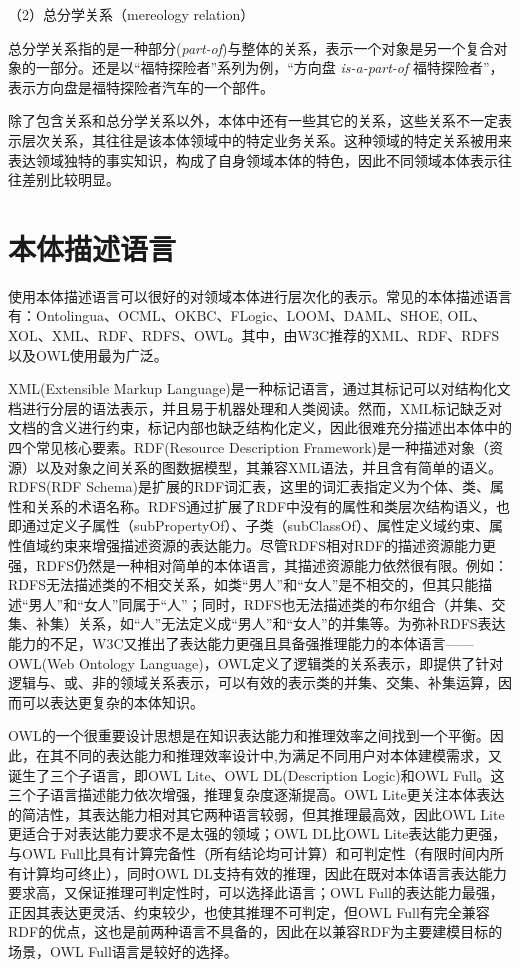 （2）总分学关系（mereology relation）

总分学关系指的是一种部分(\textit{part-of})与整体的关系，表示一个对象是另一个复合对象的一部分。还是以“福特探险者”系列为例，“方向盘 \textit{is-a-part-of} 福特探险者”，表示方向盘是福特探险者汽车的一个部件。

除了包含关系和总分学关系以外，本体中还有一些其它的关系，这些关系不一定表示层次关系，其往往是该本体领域中的特定业务关系。这种领域的特定关系被用来表达领域独特的事实知识，构成了自身领域本体的特色，因此不同领域本体表示往往差别比较明显。

\section{本体描述语言}
使用本体描述语言可以很好的对领域本体进行层次化的表示。常见的本体描述语言有：Ontolingua、OCML、OKBC、FLogic、LOOM、DAML、SHOE, OIL、XOL、XML、RDF、RDFS、OWL\cite{Corcho}。其中，由W3C推荐的XML、RDF、RDFS以及OWL使用最为广泛。

XML(Extensible Markup Language)\cite{xml}是一种标记语言，通过其标记可以对结构化文档进行分层的语法表示，并且易于机器处理和人类阅读。然而，XML标记缺乏对文档的含义进行约束，标记内部也缺乏结构化定义，因此很难充分描述出本体中的四个常见核心要素。RDF(Resource Description Framework)\cite{rdf}是一种描述对象（资源）以及对象之间关系的图数据模型，其兼容XML语法，并且含有简单的语义。RDFS(RDF Schema)\cite{rdfs}是扩展的RDF词汇表，这里的词汇表指定义为个体、类、属性和关系的术语名称。RDFS通过扩展了RDF中没有的属性和类层次结构语义，也即通过定义子属性（subPropertyOf）、子类（subClassOf）、属性定义域约束、属性值域约束来增强描述资源的表达能力。尽管RDFS相对RDF的描述资源能力更强，RDFS仍然是一种相对简单的本体语言，其描述资源能力依然很有限\cite{gao}。例如：RDFS无法描述类的不相交关系，如类“男人”和“女人”是不相交的，但其只能描述“男人”和“女人”同属于“人”；同时，RDFS也无法描述类的布尔组合（并集、交集、补集）关系，如“人”无法定义成“男人”和“女人”的并集等。为弥补RDFS表达能力的不足，W3C又推出了表达能力更强且具备强推理能力的本体语言——OWL(Web Ontology Language)\cite{owl}，OWL定义了逻辑类的关系表示，即提供了针对逻辑与、或、非的领域关系表示，可以有效的表示类的并集、交集、补集运算，因而可以表达更复杂的本体知识。

OWL的一个很重要设计思想是在知识表达能力和推理效率之间找到一个平衡。因此，在其不同的表达能力和推理效率设计中,为满足不同用户对本体建模需求，又诞生了三个子语言，即OWL Lite、OWL DL(Description Logic)和OWL Full。这三个子语言描述能力依次增强，推理复杂度逐渐提高。OWL Lite更关注本体表达的简洁性，其表达能力相对其它两种语言较弱，但其推理最高效，因此OWL Lite更适合于对表达能力要求不是太强的领域；OWL DL比OWL Lite表达能力更强，与OWL Full比具有计算完备性（所有结论均可计算）和可判定性（有限时间内所有计算均可终止），同时OWL DL支持有效的推理，因此在既对本体语言表达能力要求高，又保证推理可判定性时，可以选择此语言；OWL Full的表达能力最强，正因其表达更灵活、约束较少，也使其推理不可判定，但OWL Full有完全兼容RDF的优点，这也是前两种语言不具备的，因此在以兼容RDF为主要建模目标的场景，OWL Full语言是较好的选择。

